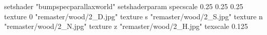setshader "bumpspecparallaxworld"
setshaderparam specscale 0.25 0.25 0.25
    texture 0 "remaster/wood/2_D.jpg"
    texture s "remaster/wood/2_S.jpg"
    texture n "remaster/wood/2_N.jpg"
    texture z "remaster/wood/2_H.jpg"
    texscale 0.125